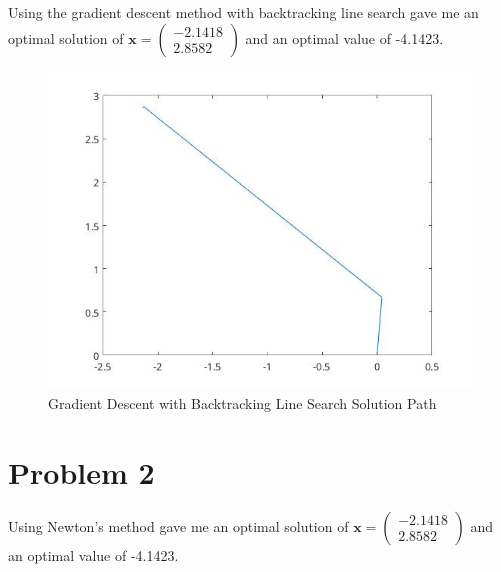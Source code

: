 \documentclass{article}
\begin{document}
Using the gradient descent method with backtracking line search gave me an optimal solution of $\mathbf{x} = \left( \begin{array}{cc} -2.1418\\2.8582 \end{array} \right)$ and an optimal value of -4.1423.

\begin{figure}[H] %
  \centering
  \includegraphics[angle=0,totalheight=50mm]{P1iigraph.jpg}
  \caption{Gradient Descent with Backtracking Line Search Solution Path}
  \label{fig:tabl}
\end{figure}

\section{Problem 2}

Using Newton's method gave me an optimal solution of $\mathbf{x} = \left( \begin{array}{cc} -2.1418\\2.8582 \end{array} \right)$ and an optimal value of -4.1423.
\end{document}
